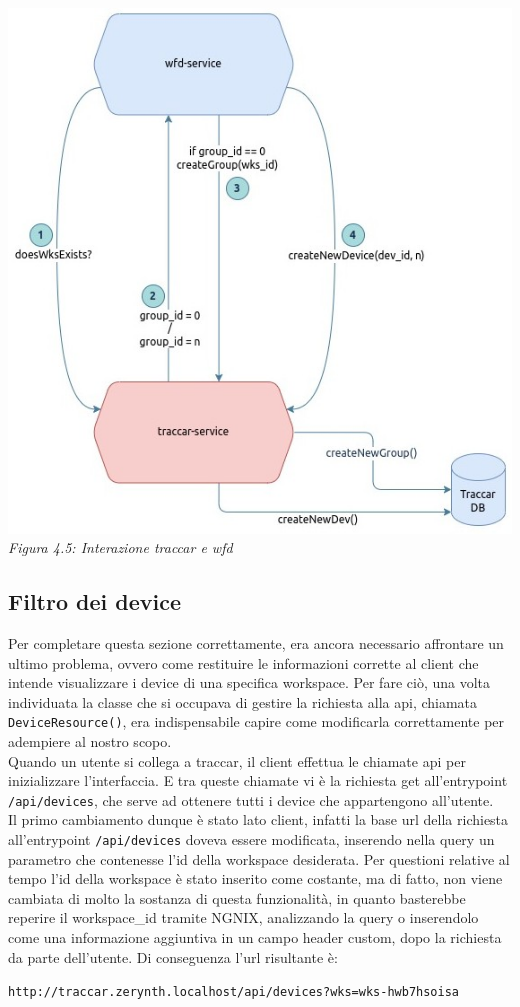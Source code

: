 \documentclass[a4paper,titlepage,12pt]{book}
\begin{document}
\begin{center}
\includegraphics[scale=0.6]{images/wfd_traccar.jpg}\\ 
\textit{Figura 4.5: Interazione traccar e wfd}
\end{center}


\subsection{\sffamily 
Filtro dei device}
Per completare questa sezione correttamente, era ancora necessario affrontare un ultimo problema, ovvero come restituire le informazioni corrette al client che intende visualizzare i device di una specifica workspace. Per fare ciò, una volta individuata la classe che si occupava di gestire la richiesta alla api, chiamata \texttt{DeviceResource()}, era indispensabile capire come modificarla correttamente per adempiere al nostro scopo.\\
Quando un utente si collega a traccar, il client effettua le chiamate api per inizializzare l'interfaccia. E tra queste chiamate vi è la richiesta get all'entrypoint \texttt{/api/devices}, che serve ad ottenere tutti i device che appartengono all'utente.\\
Il primo cambiamento dunque è stato lato client, infatti la base url della richiesta all'entrypoint \texttt{/api/devices} doveva essere modificata, inserendo nella query un parametro che contenesse l'id della workspace desiderata. Per questioni relative al tempo l'id della workspace è stato inserito come costante, ma di fatto, non viene cambiata di molto la sostanza di questa funzionalità, in quanto basterebbe reperire il workspace\_id tramite NGNIX, analizzando la query o inserendolo come una informazione aggiuntiva in un campo header custom, dopo la richiesta da parte dell'utente. Di conseguenza l'url risultante è:\par\medskip
\texttt{http://traccar.zerynth.localhost/api/devices?wks=wks-hwb7hsoisa}\par\medskip
\end{document}

